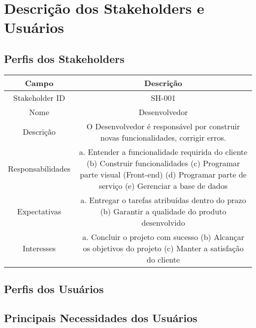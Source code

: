 \chapter{Descrição dos Stakeholders e Usuários}

\section{Perfis dos Stakeholders}

\begin{table}[!ht]
    \centering
    \begin{tabular}{|c|c|}
        Campo & Descrição \\ \hline
        Stakeholder ID & SH-001 \\ 
        Nome & Desenvolvedor \\ 
        Descrição & O Desenvolvedor é responsável por construir novas funcionalidades, corrigir erros. \\ 
        Responsabilidades & a. Entender a funcionalidade requirida do cliente (b) Construir funcionalidades (c) Programar parte visual (Front-end) (d) Programar parte de serviço (e) Gerenciar a base de dados \\ 
        Expectativas & a. Entregar o tarefas atribuídas dentro do prazo (b) Garantir a qualidade do produto desenvolvido \\ 
        Interesses & a. Concluir o projeto com sucesso (b) Alcançar os objetivos do projeto (c) Manter a satisfação do cliente \\ 
    \end{tabular}
\end{table}

\section{Perfis dos Usuários}
\section{Principais Necessidades dos Usuários}
